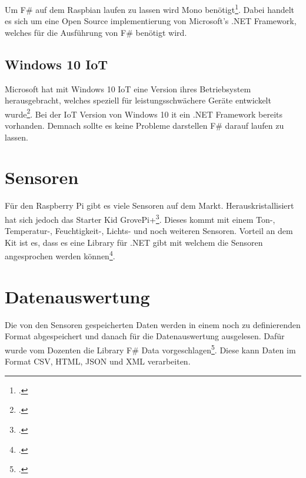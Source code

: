 Um F\# auf dem Raspbian laufen zu lassen wird Mono benötigt\footcite{Mono_2016-04-24}. Dabei handelt es sich um eine Open Source implementierung von Microsoft's .NET Framework, welches für die Ausführung von F\# benötigt wird.

\subsection{Windows 10 IoT}
Microsoft hat mit Windows 10 IoT eine Version ihres Betriebsystem herausgebracht, welches speziell für leistungsschwächere Geräte entwickelt wurde\footcite{Windows_IoT_2016-04-24}. Bei der IoT Version von Windows 10 it ein .NET Framework bereits vorhanden. Demnach sollte es keine Probleme darstellen F\# darauf laufen zu lassen.

\section{Sensoren}
Für den Raspberry Pi gibt es viele Sensoren auf dem Markt. Herauskristallisiert hat sich jedoch das Starter Kid GrovePi+\footcite{GrovePi_2016-04-24}. Dieses kommt mit einem Ton-, Temperatur-, Feuchtigkeit-, Lichts- und noch weiteren Sensoren. Vorteil an dem Kit ist es, dass es eine Library für .NET gibt mit welchem die Sensoren angesprochen werden können\footcite{NuGet_GrovePi_2016-04-24}.

\section{Datenauswertung}
Die von den Sensoren gespeicherten Daten werden in einem noch zu definierenden Format abgespeichert und danach für die Datenauswertung ausgelesen. Dafür wurde vom Dozenten die Library F# Data vorgeschlagen\footcite{Fsharp_Data_2016-04-24}. Diese kann Daten im Format CSV, HTML, JSON und XML verarbeiten. 
